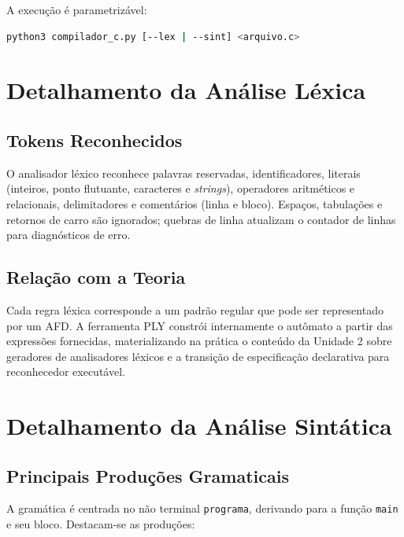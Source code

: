 \documentclass[12pt,a4paper]{article}
\begin{document}
A execução é parametrizável:

\begin{lstlisting}[style=codigo, language=bash]
python3 compilador_c.py [--lex | --sint] <arquivo.c>
\end{lstlisting}

\section{Detalhamento da Análise Léxica}

\subsection{Tokens Reconhecidos}

O analisador léxico reconhece palavras reservadas, identificadores, literais
(inteiros, ponto flutuante, caracteres e \textit{strings}), operadores aritméticos
e relacionais, delimitadores e comentários (linha e bloco). Espaços, tabulações e
retornos de carro são ignorados; quebras de linha atualizam o contador de linhas
para diagnósticos de erro.

\subsection{Relação com a Teoria}

Cada regra léxica corresponde a um padrão regular que pode ser representado por um
AFD. A ferramenta PLY constrói internamente o autômato a partir das expressões
fornecidas, materializando na prática o conteúdo da Unidade 2 sobre geradores de
analisadores léxicos e a transição de especificação declarativa para reconhecedor
executável.

\section{Detalhamento da Análise Sintática}

\subsection{Principais Produções Gramaticais}

A gramática é centrada no não terminal \texttt{programa}, derivando para a função
\texttt{main} e seu bloco. Destacam-se as produções:
\end{document}
